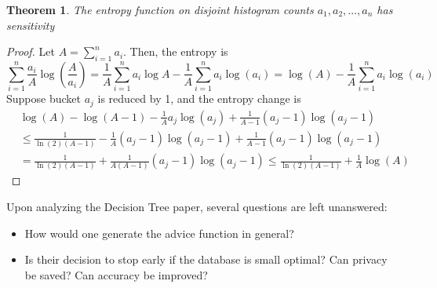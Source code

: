 \documentclass[11pt]{article}
\newtheorem{theorem}{Theorem}
\begin{document}
\begin{theorem}
The entropy function on disjoint histogram counts $a_1,a_2,\ldots, a_n$ has sensitivity
\end{theorem}
\begin{proof}
Let $A = \sum_{i=1}^n a_i$. Then, the entropy is 
\[
\sum_{i=1}^n \frac{a_i}{A}\log\left(\frac{A}{a_i}\right) = \frac{1}{A}\sum_{i=1}^n a_i\log A - \frac{1}{A} \sum_{i=1}^n a_i\log(a_i) = \log(A) - \frac{1}{A}\sum_{i=1}^n a_i\log(a_i)
\]
Suppose bucket $a_j$ is reduced by 1, and the entropy change is
\begin{align*}
&\log(A) - \log(A-1) - \frac{1}{A} a_j\log(a_j) + \frac{1}{A-1} (a_j-1)\log(a_j-1) \\
&\leq \frac{1}{\ln(2)(A-1)} -\frac{1}{A}(a_j-1)\log(a_j-1) + \frac{1}{A-1}(a_j-1)\log(a_j-1) \\
&= \frac{1}{\ln(2)(A-1)}+\frac{1}{A(A-1)}(a_j-1)\log(a_j-1) \leq \frac{1}{\ln(2)(A-1)} + \frac{1}{A}\log(A)
\end{align*}

\end{proof}
Upon analyzing the Decision Tree paper, several questions are left unanswered:
\begin{itemize}
\item How would one generate the advice function in general?
\item Is their decision to stop early if the database is small optimal? Can privacy be saved? Can accuracy be improved?
\end{itemize}



\end{document}
